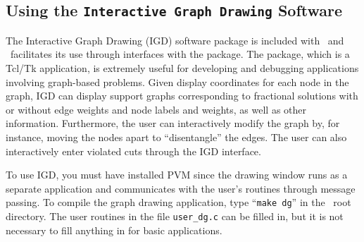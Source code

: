 \subsection{Using the {\tt Interactive Graph Drawing} Software}
\label{IGD}
The Interactive Graph Drawing (IGD) software package is included with
\BB\ and \BB\ facilitates its use through interfaces with the
package. The package, which is a Tcl/Tk application, is extremely
useful for developing and debugging applications involving graph-based
problems. Given display coordinates for each node in the graph, IGD
can display support graphs corresponding to fractional solutions with or
without edge weights and node labels and weights, as well as other
information. Furthermore, the user can interactively modify the graph
by, for instance, moving the nodes apart to ``disentangle'' the
edges. The user can also interactively enter violated cuts through the
IGD interface.

To use IGD, you must have installed PVM since the drawing window runs
as a separate application and communicates with the user's routines
through message passing. To compile the graph drawing application,
type ``{\tt make dg}'' in the \BB\ root directory. The user
routines in the file {\tt user\_dg.c} can be filled in, but it is not
necessary to fill anything in for basic applications. 

